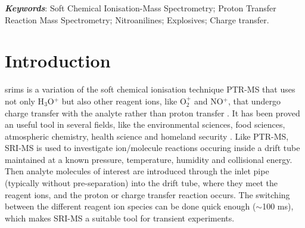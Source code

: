 \textbf{\textit{Keywords}}: Soft Chemical Ionisation-Mass Spectrometry; Proton Transfer Reaction Mass Spectrometry; Nitroanilines; Explosives; Charge transfer. 




\section{Introduction}
\acrfull{srims} is a variation of the soft chemical ionisation technique  PTR-MS that uses not only H$_3$O$^+$ but also other reagent ions, like O$_2^+$ and NO$^+$, that undergo charge transfer with the analyte rather than proton transfer \cite{ellis2013proton}.
It has been proved an useful tool in several fields, like the environmental sciences, food sciences, atmospheric chemistry, health science and homeland security \cite{biasioli2011direct,mayhew2010applications,sulzer2012proton,kassebacher2013investigations,FERNANDEZDELRIO20151243,trefz2018effects,herbig2014towards,ruzsanyi2018breath,Agarwal2011,lanza2015selective,critchley2004proton}.  
Like PTR-MS, SRI-MS is used to investigate ion/molecule reactions occuring inside a drift tube maintained at a known pressure, temperature, humidity and collisional energy. 
Then analyte molecules of interest are introduced through the inlet pipe (typically without pre-separation) into the drift tube, where they meet the reagent ions, and the proton or charge transfer reaction occurs. 
The switching between the different reagent ion species can be done quick enough ($\sim$100 ms), which makes SRI-MS a suitable tool for transient experiments.  




